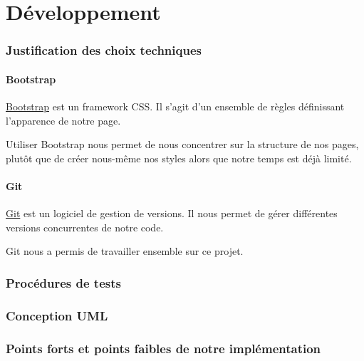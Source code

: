 \part{Développement}
\section{Justification des choix techniques}

	\subsection{Bootstrap}

		\href{http://getbootstrap.com/}{Bootstrap} est un framework CSS. Il s'agit d'un ensemble de règles définissant l'apparence de notre page.

		Utiliser Bootstrap nous permet de nous concentrer sur la structure de nos pages, plutôt que de créer nous-même nos styles alors que notre temps est déjà limité.

	\subsection{Git}

		\href{http://git-scm.com/}{Git} est un logiciel de gestion de versions. Il nous permet de gérer différentes versions concurrentes de notre code.

		Git nous a permis de travailler ensemble sur ce projet.

\section{Procédures de tests}
\section{Conception UML}
\section{Points forts et points faibles de notre implémentation}
